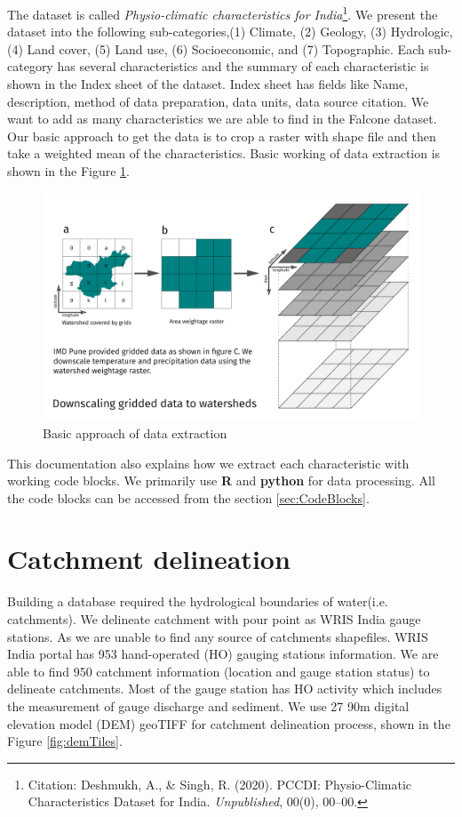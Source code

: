 \documentclass[a4paper, 12pt]{article}
\begin{document}
The dataset is called \emph{Physio-climatic characteristics for India}\footnote{Citation: Deshmukh, A., & Singh, R. (2020). PCCDI: Physio-Climatic Characteristics Dataset for India. \textit{Unpublished}, 00(0), 00–00.}. We present the dataset into the following sub-categories,(1) Climate, (2) Geology, (3) Hydrologic, (4) Land cover, (5) Land use, (6) Socioeconomic, and (7) Topographic. Each sub-category has several characteristics and the summary of each characteristic is shown in the Index sheet of the dataset. Index sheet has fields like Name, description, method of data preparation, data units, data source citation. We want to add as many characteristics we are able to find in the Falcone dataset. 
Our basic approach to get the data is to crop a raster with shape file and then take a weighted mean of the characteristics. Basic working of data extraction is shown in the Figure \ref{fig:Downscl}. 
\begin{figure}[!h]
\centering
\includegraphics[width = 1\textwidth]{Figures/Downscaling.pdf}
\caption{Basic approach of data extraction}
\label{fig:Downscl}
\end{figure}

This documentation also explains how we extract each characteristic with working code blocks. We primarily use \textbf{R} and \textbf{python} for data processing. All the code blocks can be accessed from the section \ref{sec:CodeBlocks}.  

\clearpage
\section{Catchment delineation} \label{sec:catDel} %
Building a database required the hydrological boundaries of water(i.e. catchments). We delineate catchment with pour point as WRIS India gauge stations. As we are unable to find any source of catchments shapefiles. WRIS India portal has 953 hand-operated (HO) gauging stations information. We are able to find 950 catchment information (location and gauge station status) to delineate catchments. Most of the gauge station has HO activity which includes the measurement of gauge discharge and sediment.
We use 27 90m digital elevation model (DEM) geoTIFF for catchment delineation process, shown in the Figure \ref{fig:demTiles}.
\end{document}
